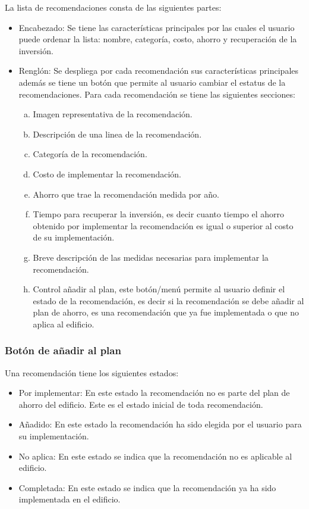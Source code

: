 La lista de recomendaciones consta de las siguientes partes:
\begin{itemize}
\item Encabezado: Se tiene las características principales por las cuales
  el usuario puede ordenar la lista: nombre, categoría, costo, ahorro y recuperación
  de la inversión.
\item Renglón: Se despliega por cada recomendación sus características principales
  además se tiene un botón que permite al usuario cambiar el estatus de la
  recomendaciones. Para cada recomendación se tiene las siguientes secciones:
  \begin{enumerate}[a)]
  \item Imagen representativa de la recomendación.
  \item Descripción de una linea de la recomendación.
  \item Categoría de la recomendación.
  \item Costo de implementar la recomendación.
  \item Ahorro que trae la recomendación medida por año.
  \item Tiempo para recuperar la inversión, es decir cuanto tiempo el ahorro
    obtenido por implementar la recomendación es igual o superior al costo
    de su implementación.
  \item Breve descripción de las medidas necesarias para implementar la
    recomendación.
  \item Control añadir al plan, este botón/menú permite al usuario definir el
    estado de la recomendación, es decir si la recomendación se debe
    añadir al plan de ahorro, es una recomendación que ya fue implementada o
    que no aplica al edificio.
  \end{enumerate}
\end{itemize}

\subsubsection{Botón de añadir al plan}

Una recomendación tiene los siguientes estados:
\begin{itemize}
\item Por implementar: En este estado la recomendación no es parte
  del plan de ahorro del edificio. Este es el estado inicial de toda
  recomendación.
\item Añadido: En este estado la recomendación ha sido elegida
  por el usuario para su implementación.
\item No aplica: En este estado se indica que la recomendación
  no es aplicable al edificio.
\item Completada: En este estado se indica que la recomendación
  ya ha sido implementada en el edificio.
\end{itemize}


